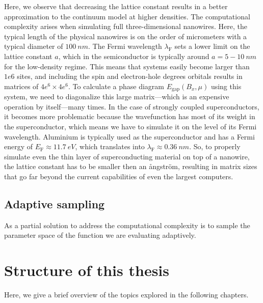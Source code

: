 Here, we observe that decreasing the lattice constant results in a better approximation to the continuum model at higher densities.
The computational complexity arises when simulating full three-dimensional nanowires.
Here, the typical length of the physical nanowires is on the order of micrometers with a typical diameter of $\SI{100}{nm}$.
The Fermi wavelength $\lambda_\textrm{F}$ sets a lower limit on the lattice constant $a$, which in the semiconductor is typically around $a=5-\SI{10}{nm}$ for the low-density regime.
This means that systems easily become larger than $1e6$ sites, and including the spin and electron-hole degrees orbitals results in matrices of $4e^6 \times 4e^6$.
To calculate a phase diagram $E_\textrm{gap}(B_x,\mu)$ using this system, we need to diagonalize this large matrix---which is an expensive operation by itself---many times.
In the case of strongly coupled superconductors, it becomes more problematic because the wavefunction has most of its weight in the superconductor, which means we have to simulate it on the level of its Fermi wavelength.
Aluminium is typically used as the superconductor and has a Fermi energy of $E_\textrm{F} \approx \SI{11.7}{eV}$, which translates into $\lambda_\textrm{F} \approx \SI{0.36}{nm}$.
So, to properly simulate even the thin layer of superconducting material on top of a nanowire, the lattice constant has to be smaller then an ångström, resulting in matrix sizes that go far beyond the current capabilities of even the largest computers.

\subsection{Adaptive sampling}
As a partial solution to address the computational complexity is to sample the parameter space of the function we are evaluating adaptively.



\section{Structure of this thesis}

Here, we give a brief overview of the topics explored in the following chapters.
\vspace{1mm}

